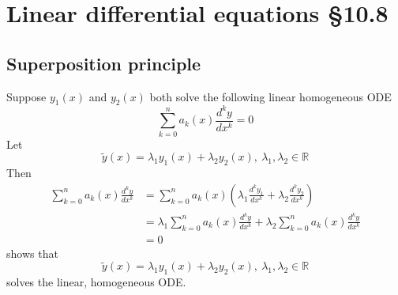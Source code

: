 \documentclass[11pt]{article}
\newcommand{\reals}{\mathbb{R}}
\begin{document}
\section{Linear differential equations §10.8}
\subsection{Superposition principle}
Suppose $y_1(x)$ and $y_2(x)$ both solve the following linear homogeneous ODE
\[ \sum_{k=0}^n a_k(x) \frac{d^ky}{dx^k} = 0 \]
Let
\[ \tilde{y}(x) = \lambda_1 y_1(x) + \lambda_2 y_2(x),\ \lambda_1, \lambda_2 \in \reals \]
Then
\begin{align*}
\sum_{k=0}^n a_k(x) \frac{d^ky}{dx^k} &= \sum_{k=0}^n a_k(x) \left( \lambda_1 \frac{d^k y_1}{dx^k} + \lambda_2 \frac{d^k y_2}{dx^k} \right) \\
&= \lambda_1 \sum_{k=0}^n a_k(x) \frac{d^k y}{dx^k} + \lambda_2 \sum_{k=0}^n a_k(x) \frac{d^k y}{dx^k} \\
&= 0
\end{align*}
shows that
\[ \tilde{y}(x) = \lambda_1 y_1(x) + \lambda_2 y_2(x),\ \lambda_1, \lambda_2 \in \reals \]
solves the linear, homogeneous ODE.
\end{document}
